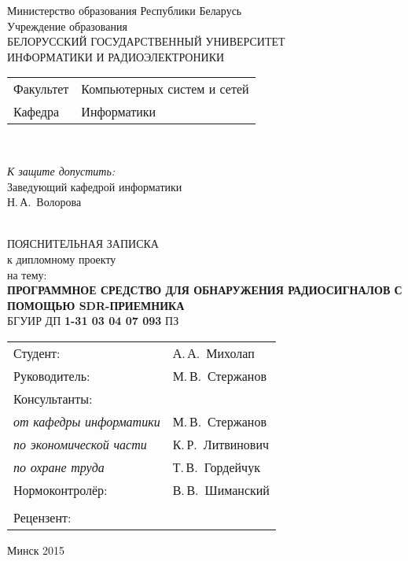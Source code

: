 \begin{titlepage}
  \begin{center}
    Министерство образования Республики Беларусь\\[1em]
    Учреждение образования\\
    БЕЛОРУССКИЙ ГОСУДАРСТВЕННЫЙ УНИВЕРСИТЕТ \\
    ИНФОРМАТИКИ И РАДИОЭЛЕКТРОНИКИ\\[1em]

    \begin{minipage}{\textwidth}
      \begin{flushleft}
        \begin{tabular}{ l l }
          Факультет & Компьютерных систем и сетей\\
          Кафедра   & Информатики
        \end{tabular}
      \end{flushleft}
    \end{minipage}\\[1em]

    \begin{minipage}{\textwidth}
      \begin{flushright}
        \textit{К защите допустить:}\\
        Заведующий кафедрой информатики\\
        \underline{\hspace*{4.5cm}} Н.\,А.~Волорова
      \end{flushright}
    \end{minipage}\\[3em]

    {ПОЯСНИТЕЛЬНАЯ ЗАПИСКА}\\
    {к дипломному проекту}\\
    {на тему:}\\[1em]
    \textbf{\large ПРОГРАММНОЕ СРЕДСТВО ДЛЯ ОБНАРУЖЕНИЯ РАДИОСИГНАЛОВ С ПОМОЩЬЮ SDR-ПРИЕМНИКА}\\[1em]


    {БГУИР ДП \textbf{1-31 03 04 07 093} ПЗ}\\[2em]
    
    \begin{tabular}{ p{}p{} }
      Студент: & А.\,А.~Михолап \\
      Руководитель: & М.\,В.~Стержанов \\
      Консультанты: &\\
      \hspace*{3ex}\emph{от кафедры информатики} & М.\,В.~Стержанов \\
      \hspace*{3ex}\emph{по экономической части} & К.\,Р.~Литвинович \\
      \hspace*{3ex}\emph{по охране труда} & Т.\,В.~Гордейчук \\
      Нормоконтролёр: & В.\,В.~Шиманский\\
      \\
      Рецензент: &
    \end{tabular}
    
    \vfill
    {\normalsize Минск 2015}
  \end{center}
\end{titlepage}
